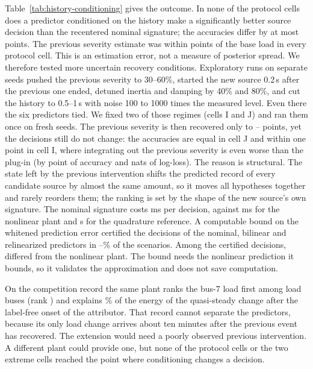 Table~\ref{tab:history-conditioning} gives the outcome. In none of the \HHCells{} protocol cells does a predictor conditioned on the history make a significantly better source decision than the recentered nominal signature; the accuracies differ by at most \HHBestGain{} points. The previous severity estimate was within \HHMaxAErr{} points of the base load in every protocol cell. This is an estimation error, not a measure of posterior spread. We therefore tested more uncertain recovery conditions. Exploratory runs on separate seeds pushed the previous severity to 30--60\%, started the new source 0.2\,s after the previous one ended, detuned inertia and damping by 40\% and 80\%, and cut the history to 0.5--1\,s with noise 100 to 1000 times the measured level. Even there the six predictors tied. We fixed two of those regimes (cells I and J) and ran them once on fresh seeds. The previous severity is then recovered only to \HHExtAErrLo{}--\HHExtAErrHi{} points, yet the decisions still do not change: the accuracies are equal in cell J and within one point in cell I, where integrating out the previous severity is even worse than the plug-in (by \HHWorstGain{} point of accuracy and \HHExtNLL{} nats of log-loss). The reason is structural. The state left by the previous intervention shifts the predicted record of every candidate source by almost the same amount, so it moves all hypotheses together and rarely reorders them; the ranking is set by the shape of the new source's own signature. The nominal signature costs \HHNominalMs{} ms per decision, against \HHPlantMs{} ms for the nonlinear plant and \HHQuadMs{} s for the quadrature reference. A computable bound on the whitened prediction error certified the decisions of the nominal, bilinear and relinearized predictors in \HHCertMin--\HHCertMax\% of the scenarios. Among the certified decisions, \HHCertFlips{} differed from the nonlinear plant. The bound needs the nonlinear prediction it bounds, so it validates the approximation and does not save computation.


On the competition record the same plant ranks the bus-7 load first among \HHRawLoads{} load buses (rank \HHRawRank) and explains \HHRawExplained\% of the energy of the quasi-steady change after the label-free onset of the attributor. That record cannot separate the predictors, because its only load change arrives about ten minutes after the previous event has recovered. The extension would need a poorly observed previous intervention. A different plant could provide one, but none of the \HHCells{} protocol cells or the two extreme cells reached the point where conditioning changes a decision.
